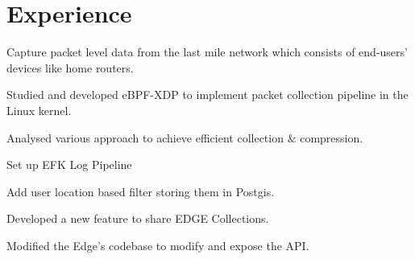\documentclass[letterpaper]{deedy-resume} %
\begin{document}
\begin{minipage}[t]{0.66\textwidth} %


\section{Experience}

\vspace{\topsep} %
\begin{tightitemize}
\item Capture packet level data from the last mile network which consists of end-users’ devices like home routers.
\item Studied and developed eBPF-XDP to implement packet collection pipeline in the Linux kernel.
\item Analysed various approach to achieve efficient collection \& compression.
\end{tightitemize}

\sectionspace %


\begin{tightitemize}
\item Set up EFK Log Pipeline
\item Add user location based filter storing them in Postgis.
\end{tightitemize}

\sectionspace %


\begin{tightitemize}
\item Developed a new feature to share EDGE Collections.
\item Modified the Edge's codebase to modify and expose the API.
\end{tightitemize}


\end{minipage}
\end{document}
